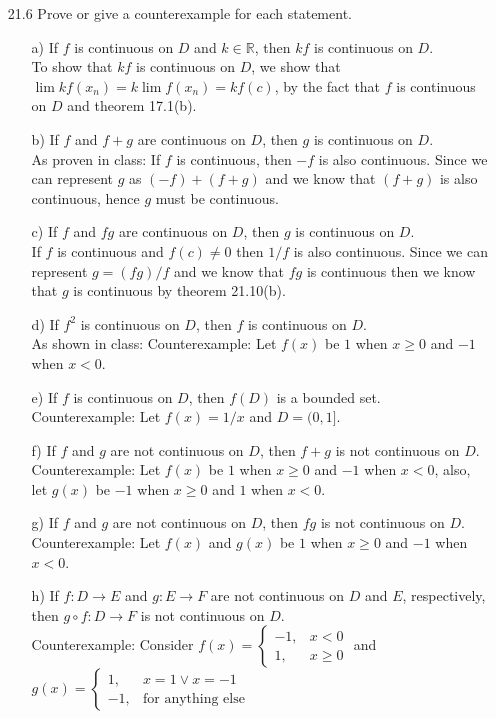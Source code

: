 \documentclass[12pt]{article}
\begin{document}
\begin{enumerate}
\begin{enumerate}
\item[21.6] Prove or give a counterexample for each statement.
\begin{enumerate}
\item[a)] If $f$ is continuous on $D$ and $k \in \mathbb{R}$, then $kf$ is continuous on $D$. \\
To show that $kf$ is continuous on $D$, we show that 
$\lim kf(x_n) = k \lim f(x_n) = kf(c)$, by the fact that $f$ is continuous on $D$
and theorem 17.1(b).
\item[b)] If $f$ and $f + g$ are continuous on $D$, then $g$ is continuous on $D$. \\
As proven in class: If $f$ is continuous, then $-f$ is also continuous. Since
we can represent $g$ as $(-f) + (f + g)$ and we know that $(f + g)$ is also continuous,
hence $g$ must be continuous.
\item[c)] If $f$ and $fg$ are continuous on $D$, then $g$ is continuous on $D$. \\
If $f$ is continuous and $f(c) \neq 0$ then $1/f$ is also continuous. Since
we can represent $g = (fg)/f$ and we know that $fg$ is continuous then we know that
$g$ is continuous by theorem 21.10(b).
\item[d)] If $f^2$ is continuous on $D$, then $f$ is continuous on $D$. \\
As shown in class: Counterexample: Let $f(x)$ be $1$ when $x \geq 0$ and 
$-1$ when $x < 0$.
\item[e)] If $f$ is continuous on $D$, then $f(D)$ is a bounded set. \\
Counterexample: Let $f(x) = 1/x$ and $D = (0, 1]$.
\item[f)] If $f$ and $g$ are not continuous on $D$, then $f+g$ is not continuous on $D$. \\
Counterexample: Let $f(x)$ be $1$ when $x \geq 0$ and 
$-1$ when $x < 0$, also, let $g(x)$ be $-1$ when $x \geq 0$ and 
$1$ when $x < 0$.
\item[g)] If $f$ and $g$ are not continuous on $D$, then $fg$ is not continuous on $D$. \\
Counterexample: Let $f(x)$ and $g(x)$ be $1$ when $x \geq 0$ and 
$-1$ when $x < 0$.
\item[h)] If $f: D \rightarrow E$ and $g: E \rightarrow F$ are not continuous on $D$ and $E$, respectively, then $g \circ f : D \rightarrow F$ is not continuous on $D$. \\
Counterexample: Consider $ f(x) = 
\begin{cases}
-1, & x < 0 \\
1, & x \geq 0
\end{cases}
$ \quad and \\ 
$g(x) = 
\begin{cases}
1, & x = 1 \vee x = -1 \\
-1, & \mbox{for anything else} 
\end{cases}
$
\end{enumerate}


\end{enumerate}
\end{enumerate}
\end{document}
